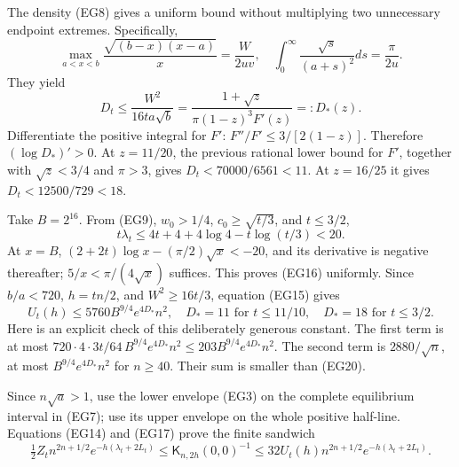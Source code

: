 \documentclass[10pt]{article}
\begin{document}
The density (EG8) gives a uniform bound without multiplying two unnecessary endpoint extremes. Specifically, \[
 \max_{a<x<b}\frac{\sqrt{(b-x)(x-a)}}x=\frac W{2uv},
 \quad \int_0^\infty\frac{\sqrt s}{(a+s)^2}ds=\frac\pi{2u}.
\] They yield \[
 D_t\le\frac{W^2}{16ta\sqrt b}
 =\frac{1+\sqrt z}{\pi(1-z)^3F'(z)}=:D_*(z).
 \tag{EG19}
\] Differentiate the positive integral for \(F'\): \(F''/F'\le3/[2(1-z)]\). Therefore \((\log D_*)'>0\). At \(z=11/20\), the previous rational lower bound for \(F'\), together with \(\sqrt z<3/4\) and \(\pi>3\), gives \(D_t<70000/6561<11\). At \(z=16/25\) it gives \(D_t<12500/729<18\).

Take \(B=2^{16}\). From (EG9), \(w_0>1/4\), \(c_0\ge\sqrt{t/3}\), and \(t\le3/2\), \[
 t\lambda_t\le4t+4+4\log4-t\log(t/3)<20.
\] At \(x=B\), \((2+2t)\log x-(\pi/2)\sqrt x<-20\), and its derivative is negative thereafter; \(5/x<\pi/(4\sqrt x)\) suffices. This proves (EG16) uniformly. Since \(b/a<720\), \(h=tn/2\), and \(W^2\ge16t/3\), equation (EG15) gives \[
 U_t(h)\le5760B^{9/4}e^{4D_*}n^2,
 \quad D_*=11\text{ for }t\le11/10,
 \quad D_*=18\text{ for }t\le3/2.
 \tag{EG20}
\] Here is an explicit check of this deliberately generous constant. The first term is at most \(720\cdot4\cdot3t/64\, B^{9/4}e^{4D_*}n^2\le203B^{9/4}e^{4D_*}n^2\). The second term is \(2880/\sqrt n\), at most \(B^{9/4}e^{4D_*}n^2\) for \(n\ge40\). Their sum is smaller than (EG20).

Since \(n\sqrt a>1\), use the lower envelope (EG3) on the complete equilibrium interval in (EG7); use its upper envelope on the whole positive half-line. Equations (EG14) and (EG17) prove the finite sandwich \[
 \boxed{\tfrac12 Z_t n^{2n+1/2}e^{-h(\lambda_t+2L_t)}
 \le\mathsf K_{n,2h}(0,0)^{-1}
 \le32U_t(h)n^{2n+1/2}e^{-h(\lambda_t+2L_t)}.}
 \tag{EG21}
\]
\end{document}
